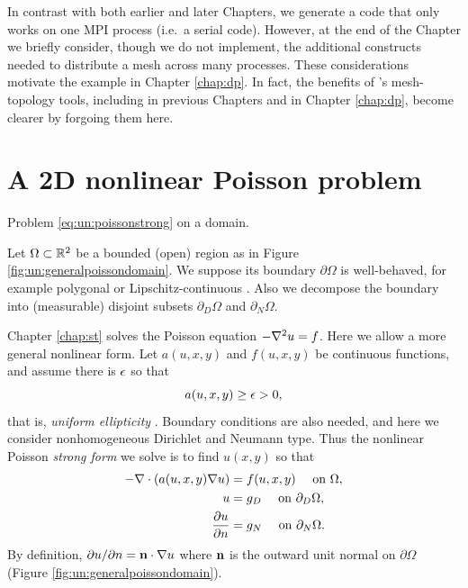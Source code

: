 In contrast with both earlier and later Chapters, we generate a code that only works on one MPI process (i.e.~a serial code).  However, at the end of the Chapter we briefly consider, though we do not implement, the additional constructs needed to distribute a mesh across many processes.  These considerations motivate the \pDMPlex example in Chapter \ref{chap:dp}.  In fact, the benefits of \PETSc's mesh-topology \pDM tools, including \pDMDA in previous Chapters and \pDMPlex in Chapter \ref{chap:dp}, become clearer by forgoing them here.


\section{A 2D nonlinear Poisson problem}

\begin{marginfigure}

\caption{Problem \eqref{eq:un:poissonstrong} on a domain.}
\label{fig:un:generalpoissondomain}
\end{marginfigure}

Let $\Omega \subset \mathbb{R}^2$ be a bounded (open) region as in Figure \ref{fig:un:generalpoissondomain}.  We suppose its boundary $\partial\Omega$ is well-behaved, for example polygonal or Lipschitz-continuous \citep[section 1.2]{Ciarlet2002}.  Also we decompose the boundary into (measurable) disjoint subsets $\partial_D \Omega$ and $\partial_N \Omega$.

Chapter \ref{chap:st} solves the Poisson equation $- \nabla^2 u = f$.  Here we allow a more general nonlinear form.  Let $a(u,x,y)$ and $f(u,x,y)$ be continuous functions, and assume there is $\epsilon$ so that
\begin{equation}
a(u,x,y) \ge \epsilon > 0, \label{eq:un:uniformelliptic}
\end{equation}
that is, \emph{uniform ellipticity} \citep{Evans2010}.  Boundary conditions are also needed, and here we consider nonhomogeneous Dirichlet and Neumann type.  Thus the  nonlinear Poisson \emph{strong form} we solve is to find $u(x,y)$ so that
\begin{align}
- \nabla\cdot \left(a(u,x,y) \nabla u\right) &= f(u,x,y) \quad \text{ on } \Omega, \label{eq:un:poissonstrong} \\
u &= g_D \quad \text{ on } \partial_D \Omega, \notag \\
\frac{\partial u}{\partial n} &= g_N \quad \text{ on } \partial_N \Omega. \notag
\end{align}
By definition, $\partial u/\partial n = \mathbf{n} \cdot \nabla u$ where $\mathbf{n}$ is the outward unit normal on $\partial \Omega$ (Figure \ref{fig:un:generalpoissondomain}).

